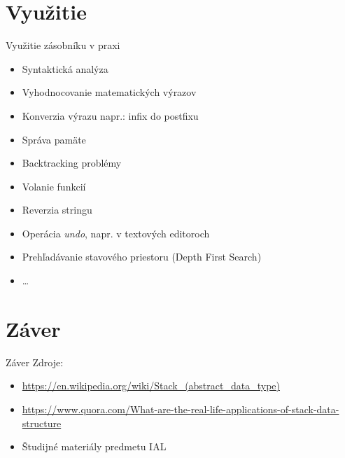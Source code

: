 \documentclass{beamer}
\begin{document}
\section{Využitie}
\begin{frame}{Využitie zásobníku v praxi}
    \begin{itemize}
        \item Syntaktická analýza
        \item Vyhodnocovanie matematických výrazov
        \item Konverzia výrazu napr.: infix do postfixu
        \item Správa pamäte
        \item Backtracking problémy
        \item Volanie funkcií
        \item Reverzia stringu
        \item Operácia \emph{undo}, napr. v textových editoroch
        \item Prehľadávanie stavového priestoru (Depth First Search)
        \item \dots
    \end{itemize}
\end{frame}


\section{Záver}
\begin{frame}{Záver}
    Zdroje:
    \begin{itemize}
        \item \url{https://en.wikipedia.org/wiki/Stack_(abstract_data_type)}
        \item \url{https://www.quora.com/What-are-the-real-life-applications-of-stack-data-structure}
        \item Študijné materiály predmetu IAL
    \end{itemize}
    \bigskip
\end{frame}
\end{document}
